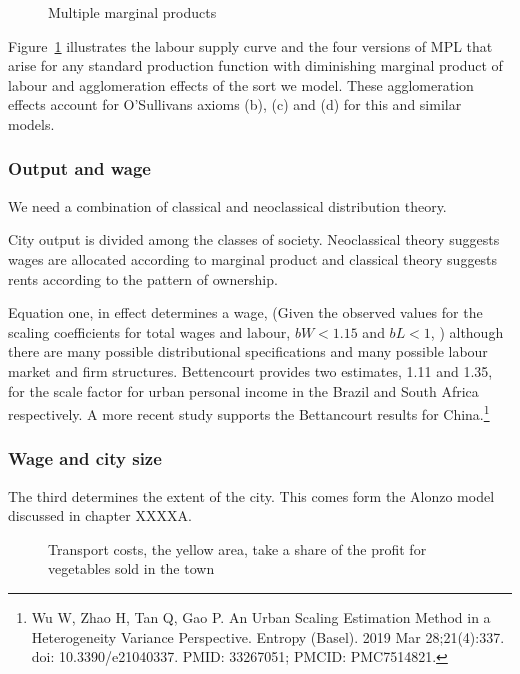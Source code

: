 \begin{figure}[tb]
\begin{center}

\caption{Multiple marginal products}
\label{fig-growth-amenity.tex}
\end{center}
\end{figure}

 Figure~\ref{fig-growth-amenity.tex} illustrates the labour supply curve and the four versions of MPL that arise for any standard production function with diminishing marginal product of labour and agglomeration effects of the sort we model. These agglomeration effects account for O'Sullivans axioms (b), (c) and (d) for this and similar models. 

 
\subsubsection{Output and wage}
We need a combination of classical and neoclassical distribution theory.

City output is divided among the classes of society. Neoclassical theory suggests wages are allocated according to marginal product and classical theory suggests rents according to the pattern of ownership.

Equation one, in effect determines a wage, (Given the observed values for the scaling coefficients for total wages and labour, $bW < 1.15$ and $bL < 1$, )  although there are many possible distributional specifications and many possible labour market and firm structures. Bettencourt provides two  estimates,  1.11 and 1.35, for the scale factor for urban personal income in the Brazil and South Africa respectively. A more recent  study supports the Bettancourt results for China.\footnote{Wu W, Zhao H, Tan Q, Gao P. An Urban Scaling Estimation Method in a Heterogeneity Variance Perspective. Entropy (Basel). 2019 Mar 28;21(4):337. doi: 10.3390/e21040337. PMID: 33267051; PMCID: PMC7514821.} 

\subsubsection{Wage and city size}
The third determines the extent of the city. This comes form the Alonzo model discussed in chapter XXXXA. 

\begin{figure}
    \begin{center}
    
    \caption{Transport costs, the yellow area, take a share of the profit for vegetables sold in the town}
    \end{center}
\end{figure}

